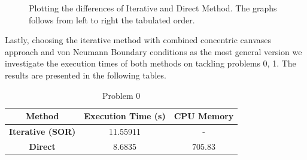 \documentclass[a4paper]{article}
\begin{document}
\begin{figure}[!h]
  \centering
  \hfill
{}\hfill
{}\hfill
  \caption{Plotting the differences of 
Iterative and Direct Method. The graphs follows from left to right the 
tabulated order.}
  \label{fig:iterVsdir}
\end{figure}

Lastly, choosing the iterative method with combined concentric canvases 
approach and von Neumann Boundary conditions as the most general version we 
investigate the execution times of both methods on tackling problems 0, 1. The 
results are presented in the following tables. 

\begin{table}[h!]
\centering
\begin{tabular}{c | c c }
\textbf{Method} & \textbf{Execution Time} (s) & \textbf{CPU Memory}\\
\hline
\textbf{Iterative (SOR)} &  11.55911 & - \\
\textbf{Direct} & 8.6835   &  705.83\\
\end{tabular}
\caption{Problem 0}
\end{table}
\end{document}
